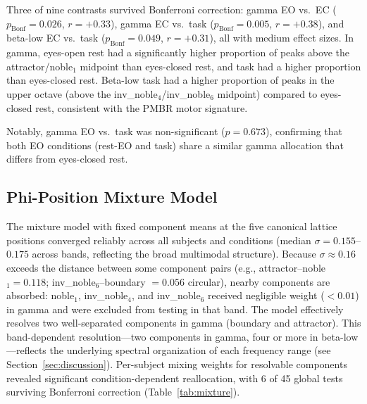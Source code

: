 \documentclass[11pt,a4paper]{article}
\begin{document}
Three of nine contrasts survived Bonferroni correction: gamma EO vs.\ EC ($p_{\text{Bonf}} = 0.026$, $r = +0.33$), gamma EC vs.\ task ($p_{\text{Bonf}} = 0.005$, $r = +0.38$), and beta-low EC vs.\ task ($p_{\text{Bonf}} = 0.049$, $r = +0.31$), all with medium effect sizes. In gamma, eyes-open rest had a significantly higher proportion of peaks above the attractor/noble$_1$ midpoint than eyes-closed rest, and task had a higher proportion than eyes-closed rest. Beta-low task had a higher proportion of peaks in the upper octave (above the inv\_noble$_4$/inv\_noble$_6$ midpoint) compared to eyes-closed rest, consistent with the PMBR motor signature.

Notably, gamma EO vs.\ task was non-significant ($p = 0.673$), confirming that both EO conditions (rest-EO and task) share a similar gamma allocation that differs from eyes-closed rest.

\subsection{Phi-Position Mixture Model}
\label{sec:mixture_results}

The mixture model with fixed component means at the five canonical lattice positions converged reliably across all subjects and conditions (median $\sigma = 0.155$--$0.175$ across bands, reflecting the broad multimodal structure). Because $\sigma \approx 0.16$ exceeds the distance between some component pairs (e.g., attractor--noble$_1 = 0.118$; inv\_noble$_6$--boundary $= 0.056$ circular), nearby components are absorbed: noble$_1$, inv\_noble$_4$, and inv\_noble$_6$ received negligible weight ($< 0.01$) in gamma and were excluded from testing in that band. The model effectively resolves two well-separated components in gamma (boundary and attractor). This band-dependent resolution---two components in gamma, four or more in beta-low---reflects the underlying spectral organization of each frequency range (see Section~\ref{sec:discussion}). Per-subject mixing weights for resolvable components revealed significant condition-dependent reallocation, with 6 of 45 global tests surviving Bonferroni correction (Table~\ref{tab:mixture}).
\end{document}
